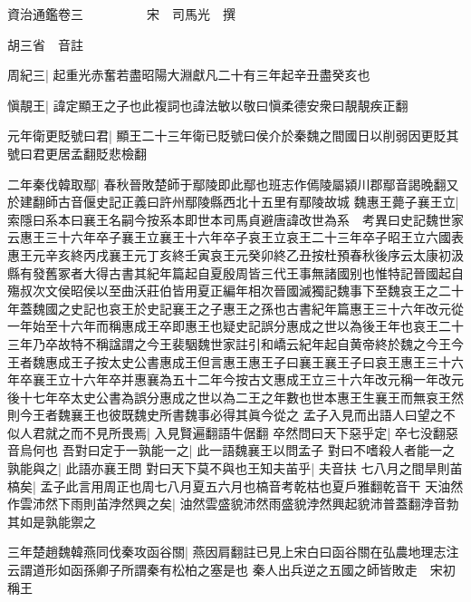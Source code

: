 資治通鑑卷三　　　　　宋　司馬光　撰

胡三省　音註

周紀三|{
	起重光赤奮若盡昭陽大淵獻凡二十有三年起辛丑盡癸亥也}


愼靚王|{
	諱定顯王之子也此複詞也諱法敏以敬曰愼柔德安衆曰靚靚疾正翻}


元年衛更貶號曰君|{
	顯王二十三年衛已貶號曰侯介於秦魏之間國日以削弱因更貶其號曰君更居孟翻貶悲檢翻}


二年秦伐韓取鄢|{
	春秋晉敗楚師于鄢陵即此鄢也班志作傿陵屬潁川郡鄢音謁晚翻又於建翻師古音偃史記正義曰許州鄢陵縣西北十五里有鄢陵故城}
魏惠王薨子襄王立|{
	索隱曰系本曰襄王名嗣今按系本即世本司馬貞避唐諱改世為系　考異曰史記魏世家云惠王三十六年卒子襄王立襄王十六年卒子哀王立哀王二十三年卒子昭王立六國表惠王元辛亥終丙戌襄王元丁亥終壬寅哀王元癸卯終乙丑按杜預春秋後序云太康初汲縣有發舊冢者大得古書其紀年篇起自夏殷周皆三代王事無諸國别也惟特記晉國起自殤叔次文侯昭侯以至曲沃莊伯皆用夏正編年相次晉國滅獨記魏事下至魏哀王之二十年蓋魏國之史記也哀王於史記襄王之子惠王之孫也古書紀年篇惠王三十六年改元從一年始至十六年而稱惠成王卒即惠王也疑史記誤分惠成之世以為後王年也哀王二十三年乃卒故特不稱諡謂之今王裴駰魏世家註引和嶠云紀年起自黄帝終於魏之今王今王者魏惠成王子按太史公書惠成王但言惠王惠王子曰襄王襄王子曰哀王惠王三十六年卒襄王立十六年卒并惠襄為五十二年今按古文惠成王立三十六年改元稱一年改元後十七年卒太史公書為誤分惠成之世以為二王之年數也世本惠王生襄王而無哀王然則今王者魏襄王也彼既魏史所書魏事必得其眞今從之}
孟子入見而出語人曰望之不似人君就之而不見所畏焉|{
	入見賢遍翻語牛倨翻}
卒然問曰天下惡乎定|{
	卒七没翻惡音烏何也}
吾對曰定于一孰能一之|{
	此一語魏襄王以問孟子}
對曰不嗜殺人者能一之孰能與之|{
	此語亦襄王問}
對曰天下莫不與也王知夫苖乎|{
	夫音扶}
七八月之間旱則苖槁矣|{
	孟子此言用周正也周七八月夏五六月也槁音考乾枯也夏戶雅翻乾音干}
天油然作雲沛然下雨則苖浡然興之矣|{
	油然雲盛貌沛然雨盛貌浡然興起貌沛普蓋翻浡音勃}
其如是孰能禦之

三年楚趙魏韓燕同伐秦攻函谷關|{
	燕因肩翻註已見上宋白曰函谷關在弘農地理志注云謂道形如函孫卿子所謂秦有松柏之塞是也}
秦人出兵逆之五國之師皆敗走　宋初稱王

